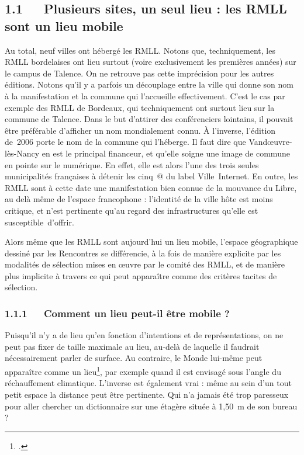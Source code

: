 \documentclass{FramateX}
\begin{document}
\begin{refsection}
\subsection*{1.1~~~Plusieurs sites, un seul lieu : les RMLL sont un lieu mobile}
{}

Au total, neuf villes ont hébergé les RMLL. Notons que, techniquement,
les RMLL bordelaises ont lieu surtout (voire exclusivement les
premières années) sur le campus de Talence. On ne retrouve pas cette
imprécision pour les autres éditions. Notons qu'il y a parfois un
découplage entre la ville qui donne son nom à la manifestation et la
commune qui l'accueille effectivement. C'est le cas par exemple des
RMLL de Bordeaux, qui techniquement ont surtout lieu sur la commune de
Talence. Dans le but d'attirer des conférenciers lointains, il pouvait
être préférable d'afficher un nom mondialement connu. À l'inverse,
l'édition de~2006 porte le nom de la commune qui l'héberge. Il faut
dire que Vandœuvre-lès-Nancy en est le principal financeur, et qu'elle
soigne une image de commune en pointe sur le numérique. En effet, elle
est alors l'une des trois seules municipalités françaises à détenir les
cinq~@ du label Ville~Internet. En outre, les RMLL sont à cette date
une manifestation bien connue de la mouvance du Libre, au delà même de
l'espace francophone : l'identité de la ville hôte est moins critique,
et n'est pertinente qu'au regard des infrastructures qu'elle est
susceptible~d'offrir.

Alors même que les RMLL sont aujourd'hui un lieu mobile, l'espace
géographique dessiné par les Rencontres se différencie, à la fois de
manière explicite par les modalités de sélection mises en œuvre par le
comité des RMLL, et de manière plus implicite à travers ce qui peut
apparaître comme des critères tacites de sélection.

\subsubsection*{1.1.1~~~Comment un lieu peut-il être mobile ?}
{}


Puisqu'il n'y a de lieu qu'en fonction d'intentions et de
représentations, on ne peut pas fixer de taille maximale au lieu,
au-delà de laquelle il faudrait nécessairement parler de surface. Au
contraire, le Monde lui-même peut apparaître comme un lieu\footnote{\cite{retailletransformation2011}.}, par exemple quand il est envisagé sous l'angle du réchauffement
climatique. L'inverse est également vrai : même au sein d'un tout petit
espace la distance peut être pertinente. Qui n'a jamais été trop
paresseux pour aller chercher un dictionnaire sur une étagère située à
1,50~m de son bureau ?


\end{refsection}
\end{document}
